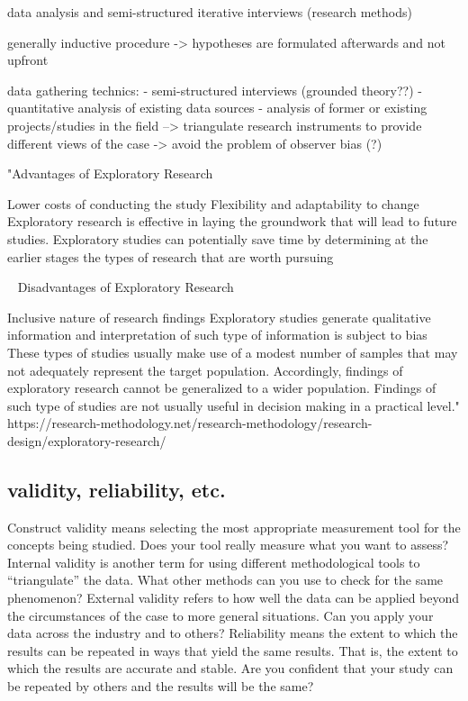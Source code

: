data analysis and semi-structured iterative interviews (research methods)


generally inductive procedure -> hypotheses are formulated afterwards and not upfront

data gathering technics:
- semi-structured interviews (grounded theory??)
- quantitative analysis of existing data sources
- analysis of former or existing projects/studies in the field
--> triangulate research instruments to provide different views of the case -> avoid the problem of observer bias (?)

"Advantages of Exploratory Research

    Lower costs of conducting the study
    Flexibility and adaptability to change
    Exploratory research is effective in laying the groundwork that will lead to future studies.
    Exploratory studies can potentially save time by determining at the earlier stages the types of research that are worth pursuing

 
Disadvantages of Exploratory Research

    Inclusive nature of research findings
    Exploratory studies generate qualitative information and interpretation of such type of information is subject to bias
    These types of studies usually make use of a modest number of samples that may not adequately represent the target population. Accordingly, findings of exploratory research cannot be generalized to a wider population.
    Findings of such type of studies are not usually useful in decision making in a practical level."
    https://research-methodology.net/research-methodology/research-design/exploratory-research/


\subsection{validity, reliability, etc.}

Construct validity means selecting the most appropriate measurement tool for the concepts
being studied. Does your tool really measure what you want to assess?
Internal validity is another term for using different methodological tools to “triangulate” the
data. What other methods can you use to check for the same phenomenon?
External validity refers to how well the data can be applied beyond the circumstances of the
case to more general situations. Can you apply your data across the industry and to others?
Reliability means the extent to which the results can be repeated in ways that yield the same
results. That is, the extent to which the results are accurate and stable. Are you confident that
your study can be repeated by others and the results will be the same?


